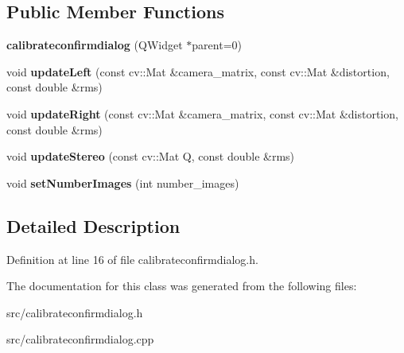 \subsection*{Public Member Functions}
\begin{DoxyCompactItemize}
\item 
\hypertarget{classcalibrateconfirmdialog_ad441884efbb852e887fbd1e76e23655d}{}{\bfseries calibrateconfirmdialog} (Q\+Widget $\ast$parent=0)\label{classcalibrateconfirmdialog_ad441884efbb852e887fbd1e76e23655d}

\item 
\hypertarget{classcalibrateconfirmdialog_a1ff7049a8a9fd467ab524fa29034ce5f}{}void {\bfseries update\+Left} (const cv\+::\+Mat \&camera\+\_\+matrix, const cv\+::\+Mat \&distortion, const double \&rms)\label{classcalibrateconfirmdialog_a1ff7049a8a9fd467ab524fa29034ce5f}

\item 
\hypertarget{classcalibrateconfirmdialog_a8bd5859b51d6196ee042e7c6212a3a37}{}void {\bfseries update\+Right} (const cv\+::\+Mat \&camera\+\_\+matrix, const cv\+::\+Mat \&distortion, const double \&rms)\label{classcalibrateconfirmdialog_a8bd5859b51d6196ee042e7c6212a3a37}

\item 
\hypertarget{classcalibrateconfirmdialog_a57e87da51c71e7e247520ae53ff3ac4f}{}void {\bfseries update\+Stereo} (const cv\+::\+Mat Q, const double \&rms)\label{classcalibrateconfirmdialog_a57e87da51c71e7e247520ae53ff3ac4f}

\item 
\hypertarget{classcalibrateconfirmdialog_ab5482a638c5af7c0d1a6ebfb57972d76}{}void {\bfseries set\+Number\+Images} (int number\+\_\+images)\label{classcalibrateconfirmdialog_ab5482a638c5af7c0d1a6ebfb57972d76}

\end{DoxyCompactItemize}


\subsection{Detailed Description}


Definition at line 16 of file calibrateconfirmdialog.\+h.



The documentation for this class was generated from the following files\+:\begin{DoxyCompactItemize}
\item 
src/calibrateconfirmdialog.\+h\item 
src/calibrateconfirmdialog.\+cpp\end{DoxyCompactItemize}
